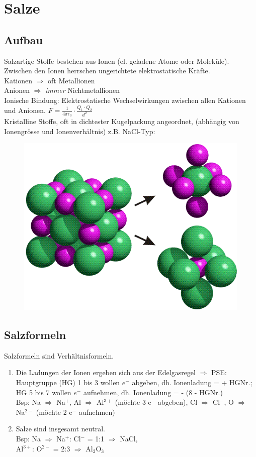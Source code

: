 \section{Salze}

\subsection{Aufbau}
Salzartige Stoffe bestehen aus Ionen (el. geladene Atome oder Moleküle). Zwischen den Ionen herrschen ungerichtete elektrostatische Kräfte.\\ Kationen $\Rightarrow$ oft Metallionen\\Anionen $\Rightarrow$ \emph{immer} Nichtmetallionen \\
Ionische Bindung: Elektrostatische Wechselwirkungen zwischen allen Kationen und Anionen. $F = \frac{1}{4 \pi \epsilon_0} \cdot \frac{Q_1 \cdot Q_2}{d^2}$ \\
Kristalline Stoffe, oft in dichtester Kugelpackung angeordnet, (abhängig von Ionengrösse und Ionenverhältnis) z.B. NaCl-Typ:
\begin{figure}[h!]
	\centering
	\includegraphics[width=0.4\linewidth]{images/5_Elementarzelle_NaCl.png}
\end{figure}

\subsection{Salzformeln}
Salzformeln sind Verhältnisformeln.
\begin{enumerate}[nolistsep]
	\item Die Ladungen der Ionen ergeben sich aus der Edelgasregel $\Rightarrow$ PSE: Hauptgruppe (HG) 1 bis 3 wollen $e^-$ abgeben, dh. Ionenladung = + HGNr.; HG 5 bis 7 wollen $e^-$ aufnehmen, dh. Ionenladung = - (8 - HGNr.)\\ 
	Bsp: Na $\Rightarrow$ Na$^+$, Al $\Rightarrow$ Al$^{3+}$ (möchte 3 e$^-$ abgeben), Cl $\Rightarrow$ Cl$^-$, O $\Rightarrow$ Na$^{2-}$ (möchte 2 e$^-$ aufnehmen)
	\item Salze sind insgesamt neutral. \\
	Bsp: Na $\Rightarrow$ Na$^+$: Cl$^-$ = 1:1  $\Rightarrow$  NaCl,\\
	Al$^{3+}$: O$^{2-}$ = 2:3 $\Rightarrow$ Al$_2$O$_3$
\end{enumerate}

